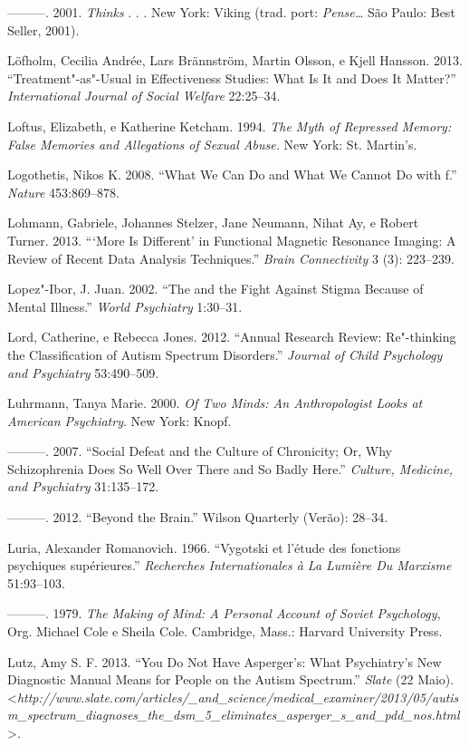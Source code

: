 ---------. 2001. \emph{Thinks} . . . New York: Viking (trad. port:
\emph{Pense\ldots{}} São Paulo: Best Seller, 2001).

Löfholm, Cecilia Andrée, Lars Brännström, Martin Olsson, e Kjell
Hansson. 2013. ``Treatment"-as"-Usual in Effectiveness Studies: What Is It
and Does It Matter?'' \emph{International Journal of Social Welfare}
22:25--34.

Loftus, Elizabeth, e Katherine Ketcham. 1994. \emph{The Myth of
Repressed Memory: False Memories and Allegations of Sexual Abuse.} New
York: St. Martin's.

Logothetis, Nikos K. 2008. ``What We Can Do and What We Cannot Do with
f.'' \emph{Nature} 453:869--878.

Lohmann, Gabriele, Johannes Stelzer, Jane Neumann, Nihat Ay, e Robert
Turner. 2013. ```More Is Different' in Functional Magnetic Resonance
Imaging: A Review of Recent Data Analysis Techniques.'' \emph{Brain
Connectivity} 3 (3): 223--239.

Lopez"-Ibor, J. Juan. 2002. ``The  and the Fight Against Stigma
Because of Mental Illness.'' \emph{World Psychiatry} 1:30--31.

Lord, Catherine, e Rebecca Jones. 2012. ``Annual Research Review:
Re"-thinking the Classification of Autism Spectrum Disorders.''
\emph{Journal of Child Psychology and Psychiatry} 53:490--509.

Luhrmann, Tanya Marie. 2000. \emph{Of Two Minds: An Anthropologist Looks
at American Psychiatry}. New York: Knopf.

---------. 2007. ``Social Defeat and the Culture of Chronicity; Or, Why
Schizophrenia Does So Well Over There and So Badly Here.''
\emph{Culture, Medicine, and Psychiatry} 31:135--172.

---------. 2012. ``Beyond the Brain.'' Wilson Quarterly (Verão): 28--34.

Luria, Alexander Romanovich. 1966. ``Vygotski et l'étude des fonctions
psychiques supérieures.'' \emph{Recherches Internationales à La Lumière
Du Marxisme} 51:93--103.

---------. 1979. \emph{The Making of Mind: A Personal Account of Soviet
Psychology}, Org. Michael Cole e Sheila Cole. Cambridge, Mass.: Harvard
University Press.

Lutz, Amy S. F. 2013. ``You Do Not Have Asperger's: What Psychiatry's
New Diagnostic Manual Means for People on the Autism Spectrum.''
\emph{Slate} (22 Maio).
\textless{}\emph{http://www.slate.com/articles/\_and\_science/medical\_examiner/2013/05/autism\_spectrum\_diagnoses\_the\_dsm\_5\_eliminates\_asperger\_s\_and\_pdd\_nos.html}\textgreater{}.

